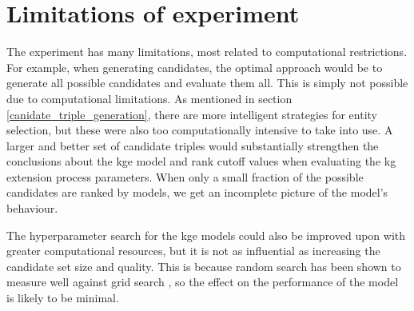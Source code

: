 \section{Limitations of experiment}
\label{experiment_limitations}
The experiment has many limitations, most related to computational restrictions. For example, when generating candidates, the optimal approach would be to generate all possible candidates and evaluate them all. This is simply not possible due to computational limitations. As mentioned in section \ref{canidate_triple_generation}, there are more intelligent strategies for entity selection, but these were also too computationally intensive to take into use. A larger and better set of candidate triples would substantially strengthen the conclusions about the \gls{kge} model and rank cutoff values when evaluating the \gls{kg} extension process parameters. When only a small fraction of the possible candidates are ranked by models, we get an incomplete picture of the model's behaviour.

The hyperparameter search for the \gls{kge} models could also be improved upon with greater computational resources, but it is not as influential as increasing the candidate set size and quality. This is because random search has been shown to measure well against grid search \cite{li2017hyperband}, so the effect on the performance of the model is likely to be minimal.